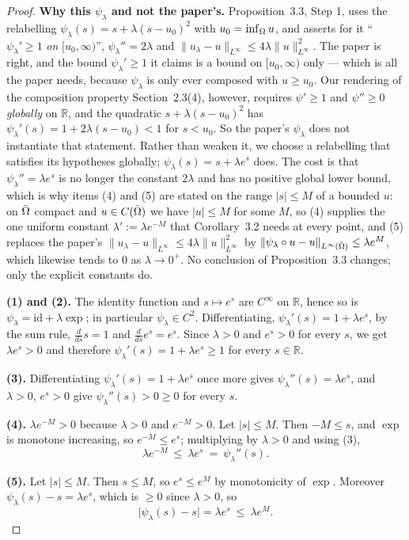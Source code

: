 \begin{proof}
\textbf{Why this $\psi_\lambda$ and not the paper's.} Proposition~3.3, Step 1, uses the
relabelling $\psi_\lambda(s)=s+\lambda(s-u_0)^{2}$ with $u_0=\inf_\Omega u$, and asserts for
it ``$\psi_\lambda'\ge1$ \emph{on} $[u_0,\infty)$'', $\psi_\lambda''=2\lambda$ and
$\|u_\lambda-u\|_{L^\infty}\le4\lambda\|u\|_{L^\infty}^{2}$. The paper is right, and the
bound $\psi_\lambda'\ge1$ it claims is a bound on $[u_0,\infty)$ only --- which is all the
paper needs, because $\psi_\lambda$ is only ever composed with $u\ge u_0$. Our rendering of the
composition property Section~2.3(4), however, requires $\psi'\ge1$ and $\psi''\ge0$
\emph{globally} on $\mathbb R$, and the quadratic $s+\lambda(s-u_0)^{2}$ has
$\psi_\lambda'(s)=1+2\lambda(s-u_0)<1$ for $s<u_0$. So the paper's $\psi_\lambda$ does not
instantiate that statement. Rather than weaken it, we choose a relabelling that satisfies
its hypotheses globally; $\psi_\lambda(s)=s+\lambda e^{s}$ does. The cost is that
$\psi_\lambda''=\lambda e^{s}$ is no longer the constant $2\lambda$ and has no positive
global lower bound, which is why items (4) and (5) are stated on the range $|s|\le M$ of a
bounded $u$: on $\bar{\Omega}$ compact and $u\in C(\bar{\Omega})$ we have $|u|\le M$ for some $M$, so
(4) supplies the one uniform constant $\lambda':=\lambda e^{-M}$ that Corollary~3.2 needs at
every point, and (5) replaces the paper's
$\|u_\lambda-u\|_{L^\infty}\le4\lambda\|u\|^{2}_{L^\infty}$ by
$\|\psi_\lambda\circ u-u\|_{L^\infty(\bar{\Omega})}\le\lambda e^{M}$, which likewise tends to
$0$ as $\lambda\to0^{+}$. No conclusion of Proposition~3.3 changes; only the explicit constants
do.

\medskip\noindent\textbf{(1) and (2).} The identity function and $s\mapsto e^{s}$ are
$C^{\infty}$ on $\mathbb R$, hence so is $\psi_\lambda=\mathrm{id}+\lambda\exp$; in
particular $\psi_\lambda\in C^{2}$. Differentiating,
$\psi_\lambda'(s)=1+\lambda e^{s}$, by the sum rule, $\frac{d}{ds}s=1$ and
$\frac{d}{ds}e^{s}=e^{s}$. Since $\lambda>0$ and $e^{s}>0$ for every $s$, we get
$\lambda e^{s}>0$ and therefore $\psi_\lambda'(s)=1+\lambda e^{s}\ge1$ for every
$s\in\mathbb R$.

\medskip\noindent\textbf{(3).} Differentiating $\psi_\lambda'(s)=1+\lambda e^{s}$ once more
gives $\psi_\lambda''(s)=\lambda e^{s}$, and $\lambda>0$, $e^{s}>0$ give
$\psi_\lambda''(s)>0\ge0$ for every $s$.

\medskip\noindent\textbf{(4).} $\lambda e^{-M}>0$ because $\lambda>0$ and $e^{-M}>0$. Let
$|s|\le M$. Then $-M\le s$, and $\exp$ is monotone increasing, so $e^{-M}\le e^{s}$;
multiplying by $\lambda>0$ and using (3),
\[
 \lambda e^{-M}\ \le\ \lambda e^{s}\ =\ \psi_\lambda''(s).
\]

\medskip\noindent\textbf{(5).} Let $|s|\le M$. Then $s\le M$, so $e^{s}\le e^{M}$ by
monotonicity of $\exp$. Moreover $\psi_\lambda(s)-s=\lambda e^{s}$, which is $\ge0$ since
$\lambda>0$, so
\[
 \big|\psi_\lambda(s)-s\big|=\lambda e^{s}\ \le\ \lambda e^{M}.
\]
\end{proof}
